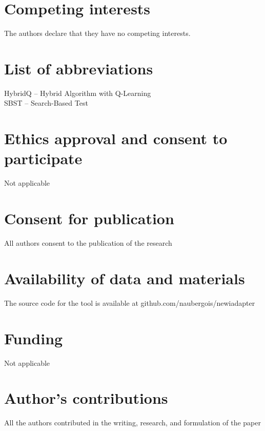 \documentclass{bmcart}
\begin{document}

\begin{backmatter}

\section*{Competing interests}
  The authors declare that they have no competing interests.
  
\section*{List of abbreviations}
HybridQ – Hybrid Algorithm with Q-Learning \\
SBST – Search-Based Test

\section*{Ethics approval and consent to participate}
Not applicable

\section*{Consent for publication}
All authors consent to the publication of the research

\section*{Availability of data and materials}
The source code for the tool is available at github.com/naubergois/newiadapter

\section*{Funding}
Not applicable

\section*{Author's contributions}
All the authors contributed in the writing, research, and formulation of the paper


\end{backmatter}
\end{document}
